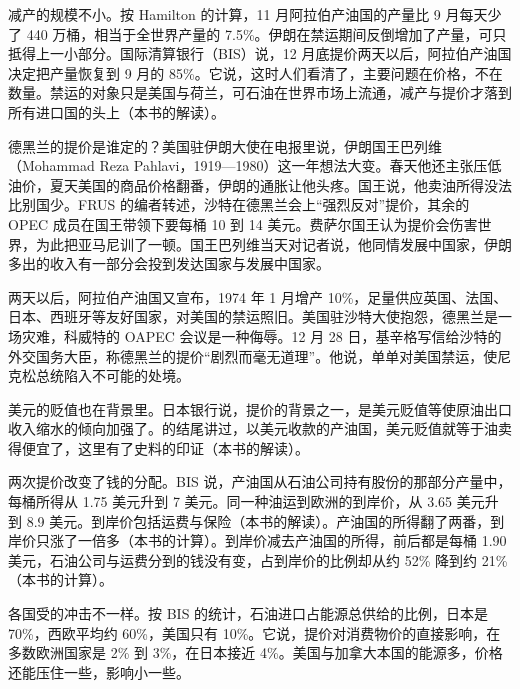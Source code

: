 减产的规模不小。按 Hamilton 的计算，11 月阿拉伯产油国的产量比 9 月每天少了 440 万桶，相当于全世界产量的 7.5\%\cite{hamilton2011}。伊朗在禁运期间反倒增加了产量，可只抵得上一小部分\cite{hamilton2011}。国际清算银行（BIS）说，12 月底提价两天以后，阿拉伯产油国决定把产量恢复到 9 月的 85\%\cite{bis1974}。它说，这时人们看清了，主要问题在价格，不在数量\cite{bis1974}。禁运的对象只是美国与荷兰，可石油在世界市场上流通，减产与提价才落到所有进口国的头上（本书的解读）。

德黑兰的提价是谁定的？美国驻伊朗大使在电报里说，伊朗国王巴列维（Mohammad Reza Pahlavi，1919—1980）这一年想法大变\cite{frus47,loc47}。春天他还主张压低油价，夏天美国的商品价格翻番，伊朗的通胀让他头疼\cite{frus47}。国王说，他卖油所得没法比别国少\cite{frus47}。FRUS 的编者转述，沙特在德黑兰会上“强烈反对”提价，其余的 OPEC 成员在国王带领下要每桶 10 到 14 美元\cite{frus47}。费萨尔国王认为提价会伤害世界，为此把亚马尼训了一顿\cite{frus47}。国王巴列维当天对记者说，他同情发展中国家，伊朗多出的收入有一部分会投到发达国家与发展中国家\cite{frus47}。

两天以后，阿拉伯产油国又宣布，1974 年 1 月增产 10\%，足量供应英国、法国、日本、西班牙等友好国家，对美国的禁运照旧\cite{frus47}。美国驻沙特大使抱怨，德黑兰是一场灾难，科威特的 OAPEC 会议是一种侮辱\cite{frus47}。12 月 28 日，基辛格写信给沙特的外交国务大臣，称德黑兰的提价“剧烈而毫无道理”\cite{frus47}。他说，单单对美国禁运，使尼克松总统陷入不可能的处境\cite{frus47}。

美元的贬值也在背景里。日本银行说，提价的背景之一，是美元贬值等使原油出口收入缩水的倾向加强了\cite{boj1986}。的结尾讲过，以美元收款的产油国，美元贬值就等于油卖得便宜了，这里有了史料的印证（本书的解读）。

两次提价改变了钱的分配。BIS 说，产油国从石油公司持有股份的那部分产量中，每桶所得从 1.75 美元升到 7 美元\cite{bis1974}。同一种油运到欧洲的到岸价，从 3.65 美元升到 8.9 美元\cite{bis1974}。到岸价包括运费与保险（本书的解读）。产油国的所得翻了两番，到岸价只涨了一倍多（本书的计算）。到岸价减去产油国的所得，前后都是每桶 1.90 美元，石油公司与运费分到的钱没有变，占到岸价的比例却从约 52\% 降到约 21\%（本书的计算）。

各国受的冲击不一样。按 BIS 的统计，石油进口占能源总供给的比例，日本是 70\%，西欧平均约 60\%，美国只有 10\%\cite{bis1974}。它说，提价对消费物价的直接影响，在多数欧洲国家是 2\% 到 3\%，在日本接近 4\%\cite{bis1974}。美国与加拿大本国的能源多，价格还能压住一些，影响小一些\cite{bis1974}。


